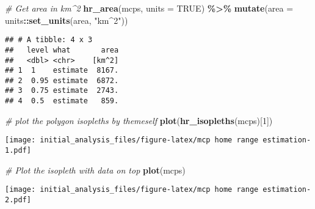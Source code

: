 \documentclass[
]{article}
\newenvironment{Shaded}{\begin{snugshade}}{\end{snugshade}}
\newcommand{\AttributeTok}[1]{\textcolor[rgb]{0.13,0.29,0.53}{#1}}
\newcommand{\CommentTok}[1]{\textcolor[rgb]{0.56,0.35,0.01}{\textit{#1}}}
\newcommand{\ConstantTok}[1]{\textcolor[rgb]{0.56,0.35,0.01}{#1}}
\newcommand{\DecValTok}[1]{\textcolor[rgb]{0.00,0.00,0.81}{#1}}
\newcommand{\FunctionTok}[1]{\textcolor[rgb]{0.13,0.29,0.53}{\textbf{#1}}}
\newcommand{\NormalTok}[1]{#1}
\newcommand{\SpecialCharTok}[1]{\textcolor[rgb]{0.81,0.36,0.00}{\textbf{#1}}}
\newcommand{\StringTok}[1]{\textcolor[rgb]{0.31,0.60,0.02}{#1}}
\begin{document}
\begin{Shaded}
\begin{Highlighting}[]
\CommentTok{\# Get area in km\^{}2}
\FunctionTok{hr\_area}\NormalTok{(mcps, }\AttributeTok{units =} \ConstantTok{TRUE}\NormalTok{) }\SpecialCharTok{\%\textgreater{}\%} 
  \FunctionTok{mutate}\NormalTok{(}\AttributeTok{area =}\NormalTok{ units}\SpecialCharTok{::}\FunctionTok{set\_units}\NormalTok{(area, }\StringTok{"km\^{}2"}\NormalTok{))}
\end{Highlighting}
\end{Shaded}

\begin{verbatim}
## # A tibble: 4 x 3
##   level what       area
##   <dbl> <chr>    [km^2]
## 1  1    estimate  8167.
## 2  0.95 estimate  6872.
## 3  0.75 estimate  2743.
## 4  0.5  estimate   859.
\end{verbatim}

\begin{Shaded}
\begin{Highlighting}[]
\CommentTok{\# plot the polygon isopleths by themeself}
\FunctionTok{plot}\NormalTok{(}\FunctionTok{hr\_isopleths}\NormalTok{(mcps)[}\DecValTok{1}\NormalTok{])}
\end{Highlighting}
\end{Shaded}

\texttt{[image: initial\_analysis\_files/figure-latex/mcp home range estimation-1.pdf]}

\begin{Shaded}
\begin{Highlighting}[]
\CommentTok{\# Plot the isopleth with data on top}
\FunctionTok{plot}\NormalTok{(mcps) }
\end{Highlighting}
\end{Shaded}

\texttt{[image: initial\_analysis\_files/figure-latex/mcp home range estimation-2.pdf]}
\end{document}
